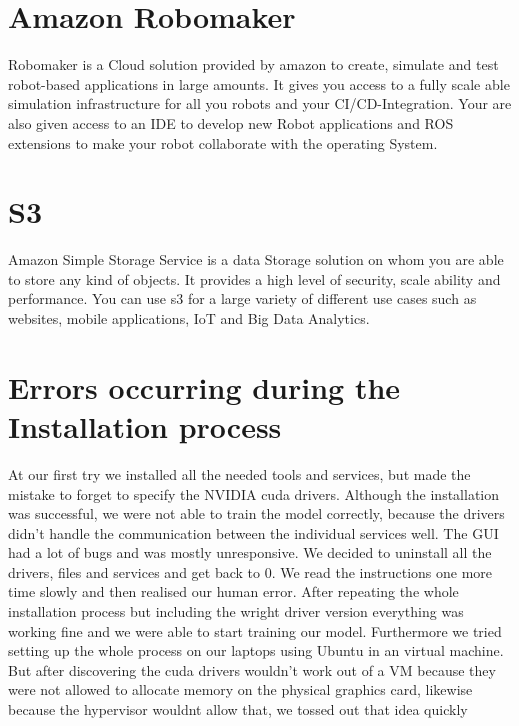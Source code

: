\section{Amazon Robomaker}
Robomaker is a Cloud solution provided by amazon to create, simulate and test robot-based applications in large amounts. It gives you access to a fully scale able simulation infrastructure for all you robots and your CI/CD-Integration. Your are also given access to an IDE to develop new Robot applications and ROS extensions to make your robot collaborate with the operating System.

\section{S3}
Amazon Simple Storage Service is a data Storage solution on whom you are able to store any kind of objects. It provides a high level of security, scale ability and performance. You can use s3 for a large variety of different use cases such as websites, mobile applications, IoT and Big Data Analytics.

\section{Errors occurring during the Installation process}
At our first try we installed all the needed tools and services, but made the mistake to forget to specify the NVIDIA cuda drivers. Although the installation was successful, we were not able to train the model correctly, because the drivers didn't handle the communication between the individual services well. The GUI had a lot of bugs and was mostly unresponsive. We decided to uninstall all the drivers, files and services and get back to 0. We read the instructions one more time slowly and then realised our human error. After repeating the whole installation process but including the wright driver version everything was working fine and we were able to start training our model. Furthermore we tried setting up the whole process on our laptops using Ubuntu in an virtual machine. But after discovering the cuda drivers wouldn't work out of a VM because they were not allowed to allocate memory on the physical graphics card, likewise because the hypervisor wouldnt allow that, we tossed out that idea quickly